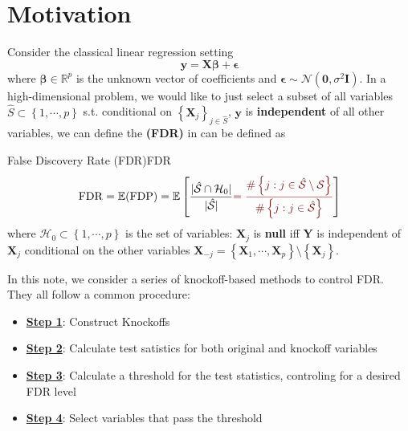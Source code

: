 \documentclass[twoside]{article}
\begin{document}

\section{Motivation}
Consider the classical linear regression setting
$$
\mathbf{y} = \mathbf{X}\boldsymbol{\beta} + \boldsymbol{\epsilon}
$$
where $\boldsymbol{\beta}\in\mathbb{R}^p$ is the unknown vector of coefficients and $\boldsymbol{\epsilon}\sim \mathcal{N}(\mathbf{0},\sigma^2\mathbf{I})$. In a high-dimensional problem, we would like to just select a subset of all variables $\hat{S}\subset \left\{ 1,\cdots,p \right\}$ s.t. conditional on $\left\{\mathbf{X}_j\right\}_{j\in\hat{S}}$, $\mathbf{y}$ is \textbf{independent} of all other variables, we can define the  \textbf{(FDR)} in can be defined as 
\begin{definition}{False Discovery Rate (FDR)}{FDR}
    \begin{align*}
        \mathrm{FDR} = \mathbb{E}(\mathrm{FDP}) = \mathbb{E}\left[ \frac{\lvert \hat{\mathcal{S}}\cap \mathcal{H}_0 \rvert}{ \lvert \hat{\mathcal{S}} \rvert } \textcolor{myred}{ =\frac{\#\left\{ j:j\in\hat{\mathcal{S}}\setminus \mathcal{S}\right\} }{\#\left\{ j:j\in\hat{\mathcal{S}}\right\} }} \right]
    \end{align*}
    where $\mathcal{H}_0\subset \left\{1,\cdots,p\right\}$ is the set of  variables: $\mathbf{X}_j$ is {\textbf{null}} iff $\mathbf{Y}$ is independent of $\mathbf{X}_j$ conditional on the other variables $\mathbf{X}_{-j}=\left\{\mathbf{X}_1,\cdots,\mathbf{X}_p\right\}\setminus \left\{\mathbf{X}_j\right\}$.
\end{definition}

In this note, we consider a series of knockoff-based methods to control FDR. They all follow a common procedure:
\begin{itemize}
    \item \textbf{\underline{Step 1}}: Construct Knockoffs 
    \item \textbf{\underline{Step 2}}: Calculate test satistics for both original and knockoff variables
    \item \textbf{\underline{Step 3}}: Calculate a threshold for the test statistics, controling for a desired FDR level
    \item \textbf{\underline{Step 4}}: Select variables that pass the threshold
\end{itemize}
\end{document}
